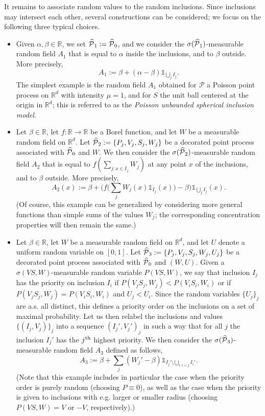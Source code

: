 \documentclass[AHL,Unicode,longabstracts]{cedram}
\newcommand{\R}{\mathbb R}
\newcommand{\Pc}{\mathcal P}
\renewcommand*{\hat}[1]{\mathchoice{\widehat{#1}}{\widehat{#1}}{\oldhat{#1}}{\oldhat{#1}}}\let\oldexists\exists
\renewcommand*{\exists}{\mathrel{\oldexists}}
\begin{document}
It remains to associate random values to the random inclusions. Since inclusions may intersect each other, several constructions can be considered; we focus on the following three typical choices.
\begin{itemize}
\item Given $\alpha,\beta\in\R$, we set $\hat\Pc_1:=\hat\Pc_0$, and we consider the $\sigma(\hat\Pc_1)$-measurable random field $A_1$ that is equal to $\alpha$ inside the inclusions, and to $\beta$ outside. More precisely,
\[
A_1:=\beta+(\alpha-\beta)\mathds1_{\bigcup_jI_j}.
\]
The simplest example is the random field $A_1$ obtained for $\Pc$ a Poisson point process on $\R^d$ with intensity $\mu=1$, and for $S$ the unit ball centered at the origin in $\R^d$; this is referred to as the \emph{Poisson unbounded spherical inclusion model}.

\item Let $\beta\in\R$, let $f:\R\to\R$ be a Borel function, and let $W$ be a measurable random field on $\R^d$. Let $\hat\Pc_2:=\{P_j,V_j,S_j,W_j\}$ be a decorated point process associated with $\hat\Pc_0$ and $W$. We then consider the $\sigma(\hat\Pc_2)$-measurable random field $A_2$ that is equal to $f(\sum_{j:x\in I_j}W_j)$ at any point $x$ of the inclusions, and to $\beta$ outside. More precisely,
\[
A_2(x):=\beta+\bigg(f\Big(\sum_{j}W_j(x)\mathds1_{I_j}(x)\Big)-\beta\bigg)\mathds1_{\bigcup_jI_j}(x).
\]
(Of course, this example can be generalized by considering more general functions than simple sums of the values $W_j$; the corresponding concentration properties will then remain the same.)
\item Let $\beta\in\R$, let $W$ be a measurable random field on $\R^d$, and let $U$ denote a uniform random variable on $[0,1]$. Let $\hat\Pc_3:=\{P_j,V_j,S_j,W_j,U_j\}$ be a decorated point process associated with $\hat\Pc_0$ and $(W,U)$. Given a $\sigma(VS,W)$-measurable random variable $P(VS,W)$, we say that inclusion $I_j$ has the priority on inclusion $I_i$ if $P(V_jS_j,W_j)<P(V_iS_i,W_i)$ or if $P(V_jS_j,W_j)=P(V_iS_i,W_i)$ and $U_j<U_i$. Since the random variables $\{U_j\}_j$ are a.s. all distinct, this defines a priority order on the inclusions on a set of maximal probability. Let us then relabel the inclusions and values $\{(I_j,V_j)\}_j$ into a sequence $(I_j',V_j')_j$ in such a way that for all $j$ the inclusion $I_j'$ has the $j^{\rm th}$ highest priority. We then consider the $\sigma(\hat\Pc_3)$-measurable random field $A_3$ defined as follows,
\[
A_3:=\beta+\sum_j(W_j'-\beta)\mathds1_{I_j'\setminus\bigcup_{i:i<j}I_i'}.
\]
(Note that this example includes in particular the case when the priority order is purely random (choosing $P\equiv0$), as well as the case when the priority is given to inclusions with e.g. larger or smaller radius (choosing $P(VS,W)=V$ or $-V$, respectively).)
\end{itemize}
\end{document}
